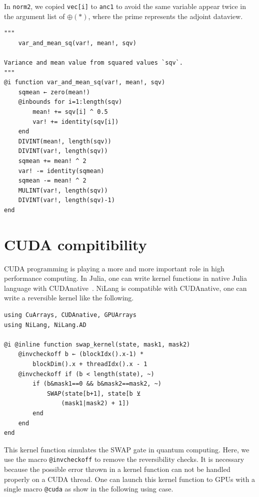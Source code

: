 \documentclass[aps,twocolumn,longbibliography,english,superscriptaddress]{revtex4-1}
\newcommand{\<}{\langle}
\renewcommand{\>}{\rangle}
\theoremstyle{definition}\newtheorem{definition}{\textit{Definition}}
\begin{document}
In \texttt{norm2}, we copied \texttt{vec[i]\textquotesingle} to \texttt{anc1} to avoid the same variable appear twice in the argument list of $\oplus(*)$, where the prime represents the adjoint dataview.

\begin{minipage}{.44\textwidth}
\begin{lstlisting}
"""
    var_and_mean_sq(var!, mean!, sqv)

Variance and mean value from squared values `sqv`.
"""
@i function var_and_mean_sq(var!, mean!, sqv)
    sqmean ← zero(mean!)
    @inbounds for i=1:length(sqv)
        mean! += sqv[i] ^ 0.5
        var! += identity(sqv[i])
    end
    DIVINT(mean!, length(sqv))
    DIVINT(var!, length(sqv))
    sqmean += mean! ^ 2
    var! -= identity(sqmean)
    sqmean -= mean! ^ 2
    MULINT(var!, length(sqv))
    DIVINT(var!, length(sqv)-1)
end
\end{lstlisting}
\end{minipage}

\section{CUDA compitibility}\label{app:cuda}
CUDA programming is playing a more and more important role in high performance computing. In Julia, one can write kernel functions in native Julia language with CUDAnative~\cite{Besard2018}.
NiLang is compatible with CUDAnative, one can write a reversible kernel like the following.

\begin{minipage}{.44\textwidth}
\begin{lstlisting}
using CuArrays, CUDAnative, GPUArrays
using NiLang, NiLang.AD

@i @inline function swap_kernel(state, mask1, mask2)
    @invcheckoff b ← (blockIdx().x-1) * 
        blockDim().x + threadIdx().x - 1
    @invcheckoff if (b < length(state), ~)
        if (b&mask1==0 && b&mask2==mask2, ~)
            SWAP(state[b+1], state[b ⊻ 
                (mask1|mask2) + 1])
        end
    end
end
\end{lstlisting}
\end{minipage}

This kernel function simulates the SWAP gate in quantum computing.
Here, we use the macro \texttt{@invcheckoff} to remove the reversibility checks.
It is necessary because the possible error thrown in a kernel function can not be handled properly on a CUDA thread.
One can launch this kernel function to GPUs with a single macro \texttt{@cuda} as show in the following using case.
\end{document}
